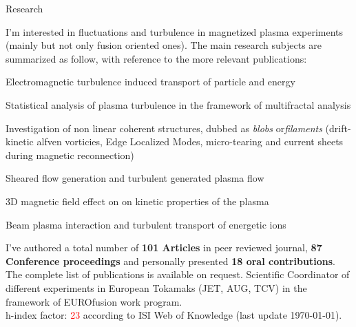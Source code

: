 \begin{cvblock}{Research}
  \end{cvblock}
I'm interested in fluctuations and turbulence in magnetized plasma
experiments (mainly but not only fusion oriented
ones). The main research subjects are summarized as follow, with
reference to the more relevant publications: 
\begin{description}[labelindent=0.5pt, labelsep*=0.4em, leftmargin=!, itemsep=0.05ex]
\item[(a)] Electromagnetic turbulence induced transport of particle
  and energy \cite{Spolaore:2004p245, Antoni:2000p3587}
\item[(b)] Statistical analysis of plasma turbulence in the framework of multifractal analysis \cite{Antoni:2001p3221, Carbone:2002p2809, Vianello:2016bm}
\item[(c)] Investigation of non linear
  coherent structures, dubbed as \emph{blobs} or\emph{filaments}
 (drift-kinetic alfven vorticies, Edge Localized Modes, micro-tearing and current
sheets during magnetic reconnection) \cite{Vianello:2010p4670, Spolaore:2015ij, PhysRevLett.106.125002, Furno:2011cs}
\item[(d)] Sheared flow generation and turbulent generated plasma
flow \cite{Vianello:2005p1976}
\item[(e)] 3D magnetic field effect on on kinetic
properties of the plasma \cite{Vianello:2015ek}
\item[(f)] Beam plasma interaction and turbulent transport of
  energetic ions
\end{description}

I've authored a total number of \textbf{101 Articles} in peer reviewed journal,
\textbf{87 Conference proceedings} and personally presented \textbf{18 oral
contributions}. The complete list of publications is available on
request. Scientific Coordinator of different experiments
in European Tokamaks (JET, AUG, TCV) in the framework of EUROfusion work program. \\
h-index factor: \textcolor{red}{23} according to ISI Web of Knowledge
(last update \today). 


\printbibliography[type=article,  title = {Relevant publications}, heading=subbibliography, prefixnumbers={A}, resetnumbers=true]

